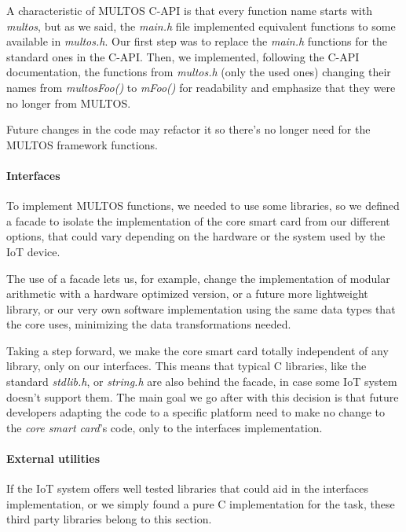 A characteristic of MULTOS C-API is that every function name starts with \textit{multos}, but as we said, the \textit{main.h} file implemented equivalent functions to some available in \textit{multos.h}. Our first step was to replace the \textit{main.h} functions for the standard ones in the C-API. Then, we implemented, following the C-API documentation, the functions from \textit{multos.h} (only the used ones) changing their names from \textit{multosFoo()} to \textit{mFoo()} for readability and emphasize that they were no longer from MULTOS.

Future changes in the code may refactor it so there's no longer need for the MULTOS framework functions.


\paragraph{Interfaces}

To implement MULTOS functions, we needed to use some libraries, so we defined a facade to isolate the implementation of the core smart card from our different options, that could vary depending on the hardware or the system used by the IoT device.

The use of a facade lets us, for example, change the implementation of modular arithmetic with a hardware optimized version, or a future more lightweight library, or our very own software implementation using the same data types that the core uses, minimizing the data transformations needed.

Taking a step forward, we make the core smart card totally independent of any library, only on our interfaces. This means that typical C libraries, like the standard \textit{stdlib.h}, or  \textit{string.h} are also behind the facade, in case some IoT system doesn't support them. The main goal we go after with this decision is that future developers adapting the code to a specific platform need to make no change to the \textit{core smart card}'s code, only to the interfaces implementation.



\paragraph{External utilities}

If the IoT system offers well tested libraries that could aid in the interfaces implementation, or we simply found a pure C implementation for the task, these third party libraries belong to this section.

